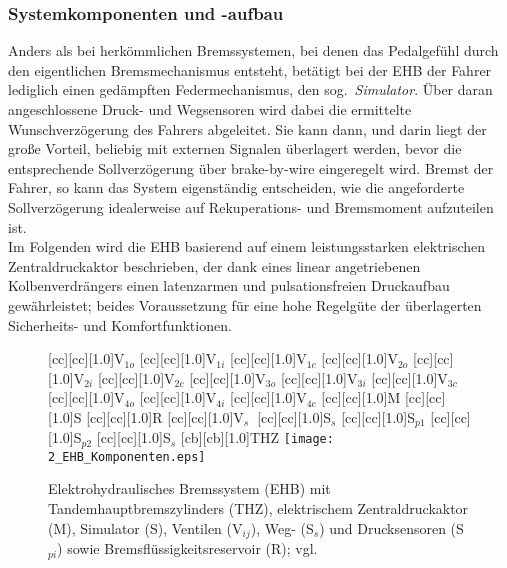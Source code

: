 \subsubsection{Systemkomponenten und -aufbau}
Anders als bei herkömmlichen Bremssystemen, bei denen das Pedalgefühl durch den eigentlichen Bremsmechanismus entsteht, betätigt bei der EHB
der Fahrer lediglich einen gedämpften Federmechanismus, den sog.\ \emph{Simulator}. Über daran angeschlossene Druck- und Wegsensoren wird dabei die ermittelte Wunschverzögerung des Fahrers abgeleitet. Sie kann dann, und darin liegt der große Vorteil, beliebig mit externen Signalen überlagert werden, bevor die entsprechende Sollverzögerung über brake-by-wire eingeregelt wird. Bremst der Fahrer, so kann das System \zB eigenständig entscheiden, wie die angeforderte Sollverzögerung idealerweise auf Rekuperations- und Bremsmoment aufzuteilen ist.\\
Im Folgenden wird die EHB basierend auf einem leistungsstarken elektrischen Zentraldruckaktor beschrieben, der dank eines linear angetriebenen Kolbenverdrängers einen latenzarmen und pulsationsfreien Druckaufbau gewährleistet; beides Voraussetzung für eine hohe Regelgüte der überlagerten Sicherheits- und Komfortfunktionen.

\begin{figure}[h]
\newcommand{\smallsize}{.75}
	[cc][cc][1.0]{V$\!_{1o}$}
	[cc][cc][1.0]{V$\!_{1i}$}
	[cc][cc][1.0]{V$\!_{1c}$}
	[cc][cc][1.0]{V$\!_{2o}$}
	[cc][cc][1.0]{V$\!_{2i}$}
	[cc][cc][1.0]{V$\!_{2c}$}
	[cc][cc][1.0]{V$\!_{3o}$}
	[cc][cc][1.0]{V$\!_{3i}$}
	[cc][cc][1.0]{V$\!_{3c}$}
	[cc][cc][1.0]{V$\!_{4o}$}
	[cc][cc][1.0]{V$\!_{4i}$}
	[cc][cc][1.0]{V$\!_{4c}$}
	[cc][cc][1.0]{M}
	[cc][cc][1.0]{S}
	[cc][cc][1.0]{R}
	[cc][cc][1.0]{V$\!_{s\,\,}$}
	[cc][cc][1.0]{S$_{s}$}
	[cc][cc][1.0]{S$_{p1}$}
	[cc][cc][1.0]{S$_{p2}$}
	[cc][cc][1.0]{S$_{s}$}
	[cb][cb][1.0]{THZ}
\centering
\texttt{[image: 2\_EHB\_Komponenten.eps]}
 \caption[Elektrohydraulisches Bremssystem]{Elektrohydraulisches Bremssystem (EHB) mit Tandemhauptbremszylinders (THZ), elektrischem Zentraldruckaktor (M), Simulator (S), Ventilen (V$_{ij}$), Weg- (S$_{s}$) und Drucksensoren (S$_{pi}$) sowie Bremsflüssigkeitsreservoir (R); vgl.\cite{breuer20012bremsenhandbuch}}
 \label{fig:ehb_aufbau}
\end{figure} 


